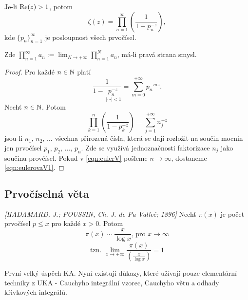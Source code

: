 \begin{theorem} [Eulerova]\label{thm:EulerovaV}
Je-li $\operatorname{Re}(z)>1$, potom 
\begin{equation}\label{eqn:eulerovaV1}
    \zeta(z)=\prod_{n=1}^\infty\left(\frac{1}{1-p_n^{-z}}\right),
\end{equation}
kde $\{p_n\}_{n=1}^\infty$ je posloupnost všech prvočísel.
\end{theorem}

\begin{note*}
Zde $\prod_{n=1}^\infty a_n:=\lim_{N\rightarrow+\infty}\prod_{n=1}^N a_n$, má-li pravá strana smysl.
\end{note*}

\begin{proof}
Pro každé $n\in\operatorname{\mathbb{N}}$ platí 
$$\frac{1}{1-\underset{\phantom{.}|\cdots|<1}{p_n^{-z}}}=\sum_{m=0}^{+\infty}p_n^{-mz}.$$
Nechť $n\in\operatorname{\mathbb{N}}$. Potom
\begin{equation}\tag{*}\label{eqn:eulerV}
    \prod_{k=1}^n\left(\frac{1}{1-p_k^{-z}}\right)=\sum_{j=1}^{+\infty}n_j^{-z}
\end{equation}
jsou-li $n_1,\,n_2,\,\ldots$ všechna přirozená čísla, která se dají rozložit na součin mocnin jen prvočísel $p_1,\,p_2,\,\ldots,\,p_n$. 
Zde se využívá jednoznačnosti faktorizace $n_j$ jako součinu provčísel. Pokud v \cref{eqn:eulerV} pošleme $n\rightarrow\infty$, dostaneme \cref{eqn:eulerovaV1}.
\end{proof}

\subsection{Prvočíselná věta}

\begin{theorem}[Prvočíselná] \emph{[HADAMARD, J.; POUSSIN, Ch. J. de Pa Valleé; 1896]}
Nechť $\pi(x)$ je počet prvočísel $p\leq x$ pro každé $x>0$. Potom 
$$\pi(x)\sim \frac{x}{\log x}\text{, pro }x\rightarrow\infty $$
$$\text{tzn. }\lim_{x\rightarrow+\infty}\frac{\pi(x)}{\left(\frac{x}{\log x}\right)}=1
$$
\end{theorem}

\begin{note*}
První velký úspěch KA. Nyní existují důkazy, které užívají pouze elementární techniky z UKA - Cauchyho integrální vzorec, Cauchyho větu a odhady křivkových integrálů.
\end{note*}